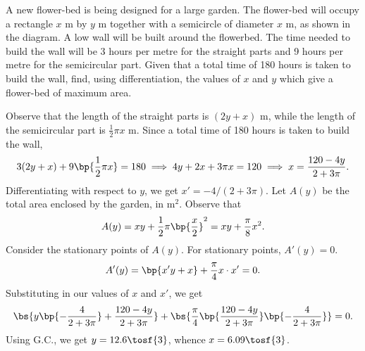 \begin{problem}
    \begin{center}
    \end{center}
    
    A new flower-bed is being designed for a large garden. The flower-bed will occupy a rectangle $x$ m by $y$ m together with a semicircle of diameter $x$ m, as shown in the diagram. A low wall will be built around the flowerbed. The time needed to build the wall will be 3 hours per metre for the straight parts and 9 hours per metre for the semicircular part. Given that a total time of 180 hours is taken to build the wall, find, using differentiation, the values of $x$ and $y$ which give a flower-bed of maximum area.
\end{problem}
\begin{solution}
    Observe that the length of the straight parts is $(2y + x)$ m, while the length of the semicircular part is $\frac12 \pi x$ m. Since a total time of 180 hours is taken to build the wall, \[3 (2y + x) + 9\bp{\frac12 \pi x} = 180 \implies 4y + 2x + 3 \pi x = 120 \implies x = \frac{120-4y}{2+3\pi}.\] Differentiating with respect to $y$, we get $x' = -4/(2 + 3\pi)$. Let $A(y)$ be the total area enclosed by the garden, in m$^2$. Observe that \[A(y) = xy + \frac12 \pi \bp{\frac{x}2}^2 = xy + \frac\pi8 x^2.\] Consider the stationary points of $A(y)$. For stationary points, $A'(y) = 0$. \[A'(y) = \bp{x' y + x} + \frac\pi4 x \cdot x' = 0.\] Substituting in our values of $x$ and $x'$, we get \[\bs{y\bp{-\frac{4}{2 + 3\pi}} + \frac{120-4y}{2+3\pi}} + \bs{\frac\pi4 \bp{\frac{120-4y}{2+3\pi}} \bp{-\frac{4}{2 + 3\pi}}} = 0.\] Using G.C., we get $y = 12.6 \tosf{3}$, whence $x = 6.09 \tosf{3}$.
\end{solution}

